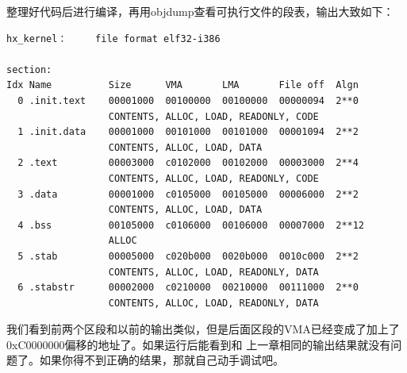 \par 整理好代码后进行编译，再用objdump查看可执行文件的段表，输出大致如下：

\begin{Verbatim}[frame=single]
hx_kernel：     file format elf32-i386

section:
Idx Name          Size      VMA       LMA       File off  Algn
  0 .init.text    00001000  00100000  00100000  00000094  2**0
                  CONTENTS, ALLOC, LOAD, READONLY, CODE
  1 .init.data    00001000  00101000  00101000  00001094  2**2
                  CONTENTS, ALLOC, LOAD, DATA
  2 .text         00003000  c0102000  00102000  00003000  2**4
                  CONTENTS, ALLOC, LOAD, READONLY, CODE
  3 .data         00001000  c0105000  00105000  00006000  2**2
                  CONTENTS, ALLOC, LOAD, DATA
  4 .bss          00105000  c0106000  00106000  00007000  2**12
                  ALLOC
  5 .stab         00005000  c020b000  0020b000  0010c000  2**2
                  CONTENTS, ALLOC, LOAD, READONLY, DATA
  6 .stabstr      00002000  c0210000  00210000  00111000  2**0
                  CONTENTS, ALLOC, LOAD, READONLY, DATA
\end{Verbatim}

\par 我们看到前两个区段和以前的输出类似，但是后面区段的VMA已经变成了加上了0xC0000000偏移的地址了。如果运行后能看到和\allowbreak
上一章相同的输出结果就没有问题了。如果你得不到正确的结果，那就自己动手调试吧。

